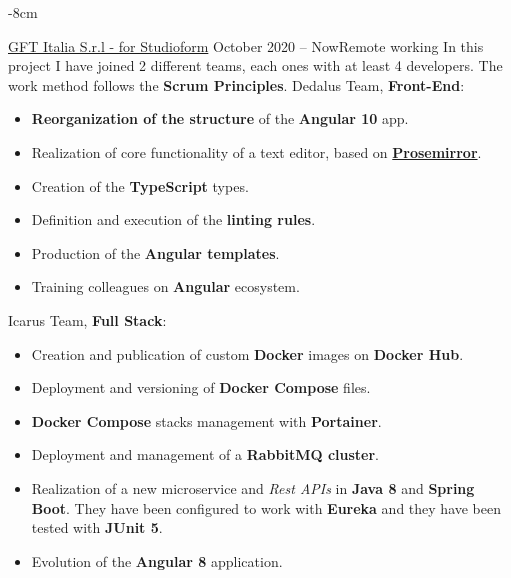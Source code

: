 \documentclass[10pt,a4paper]{altacv}
\begin{document}


\begin{adjustwidth}{}{-8cm}
\makecvheader
\end{adjustwidth}


{\href{https://studioform.org/}{GFT Italia S.r.l - for Studioform}}
{October 2020 -- Now}{Remote working}
In this project I have joined 2 different teams, each ones with at least 4 developers.
\newline
The work method follows the \textbf{Scrum Principles}.
\newline\newline
Dedalus Team, \textbf{Front-End}:
\begin{itemize}
	\item \textbf{Reorganization of the structure} of the \textbf{Angular 10} app.
	\item Realization of core functionality of a text editor, based on \textbf{\href{https://prosemirror.net/}{Prosemirror}}.
	\item Creation of the \textbf{TypeScript} types.
	\item Definition and execution of the \textbf{linting rules}.
	\item Production of the \textbf{Angular templates}.
	\item Training colleagues on \textbf{Angular} ecosystem.
\end{itemize}
\leavevmode \newline
Icarus Team, \textbf{Full Stack}:
\begin{itemize}
	\item Creation and publication of custom \textbf{Docker} images on \textbf{Docker Hub}.
	\item Deployment and versioning of \textbf{Docker Compose} files.
	\item \textbf{Docker Compose} stacks management with \textbf{Portainer}.
	\item Deployment and management of a \textbf{RabbitMQ cluster}.
	\item Realization of a new microservice and \textit{Rest APIs} in \textbf{Java 8} and \textbf{Spring Boot}.
	They have been configured to work with \textbf{Eureka} and they have been tested with \textbf{JUnit 5}.
	\item Evolution of the \textbf{Angular 8} application.
\end{itemize}
\divider
\end{document}
